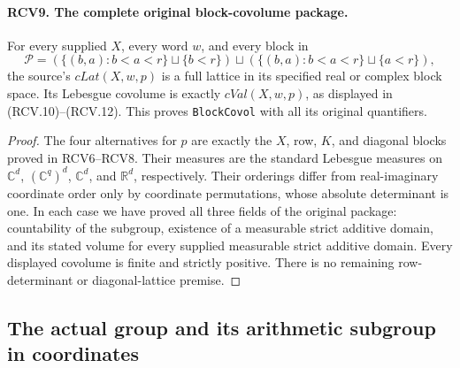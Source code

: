 \documentclass[11pt,a4paper]{article}
\numberwithin{equation}{section}
\theoremstyle{remark}\newtheorem{remark}[theorem]{Remark}
\begin{document}
\paragraph{RCV9. The complete original block-covolume package.}
\label{claim:RCV9}
For every supplied \(X\), every word \(w\), and every block in
\[
 \mathcal P=(\{(b,a):b<a<r\}\sqcup\{b<r\})
                \sqcup(\{(b,a):b<a<r\}\sqcup\{a<r\}),
\]
the source's \(cLat(X,w,p)\) is a full lattice in its specified
real or complex block space.  Its Lebesgue covolume is exactly
\(cVal(X,w,p)\), as displayed in (RCV.10)--(RCV.12).
This proves \texttt{Block\allowbreak Covol} with all its original quantifiers.
\begin{proof}
The four alternatives for \(p\) are exactly the \(X\), row,
\(K\), and diagonal blocks proved in RCV6--RCV8.  Their measures
are the standard Lebesgue measures on \(\mathbb C^d\),
\((\mathbb C^q)^d\), \(\mathbb C^d\), and \(\mathbb R^d\),
respectively.  Their orderings differ from real-imaginary coordinate
order only by coordinate permutations, whose absolute determinant
is one.  In each case we have proved all three fields of the original
package: countability of the subgroup, existence of a measurable
strict additive domain, and its stated volume for every supplied
measurable strict additive domain.  Every displayed covolume is
finite and strictly positive.  There is no remaining row-determinant
or diagonal-lattice premise.
\end{proof}

\subsection{The actual group and its arithmetic subgroup in coordinates}

\end{document}
